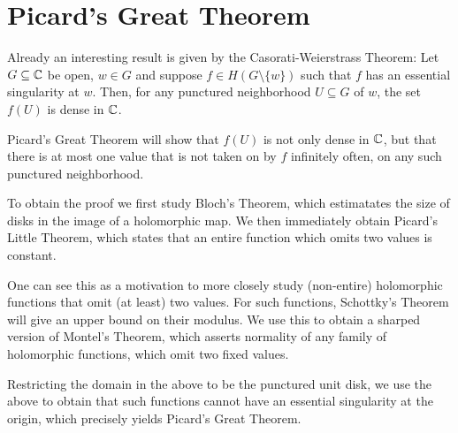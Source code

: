 \chapter{Picard's Great Theorem}
\label{ch:picards-great-theorem}


Already an interesting result is given by the Casorati-Weierstrass Theorem: Let $G \subseteq \mathbb{C}$ be open, $w \in G$ and suppose $f \in H(G \setminus \{ w \})$ such that $f$ has an essential singularity at $w$. Then, for any punctured neighborhood $U \subseteq G$ of $w$, the set $f(U)$ is dense in $\mathbb{C}$.

Picard's Great Theorem will show that $f(U)$ is not only dense in $\mathbb{C}$, but that there is at most one value that is not taken on by $f$ infinitely often, on any such punctured neighborhood.

To obtain the proof we first study Bloch's Theorem, which estimatates the size of disks in the image of a holomorphic map. We then immediately obtain Picard's Little Theorem, which states that an entire function which omits two values is constant.

One can see this as a motivation to more closely study (non-entire) holomorphic functions that omit (at least) two values. For such functions, Schottky's Theorem will give an upper bound on their modulus. We use this to obtain a sharped version of Montel's Theorem, which asserts normality of any family of holomorphic functions, which omit two fixed values.

Restricting the domain in the above to be the punctured unit disk, we use the above to obtain that such functions cannot have an essential singularity at the origin, which precisely yields Picard's Great Theorem.





